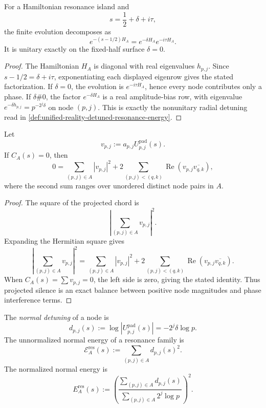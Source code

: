 \begin{theorem}
\label{thm:unified-reality-critical-line-unitary-resonance-surface}
For a Hamiltonian resonance island and
$$
s=\frac12+\delta+i\tau,
$$
the finite evolution decomposes as
$$
e^{-(s-1/2)H_A}
=
e^{-\delta H_A}e^{-i\tau H_A}.
$$
It is unitary exactly on the fixed-half surface $\delta=0$.
\end{theorem}

\begin{proof}
The Hamiltonian $H_A$ is diagonal with real eigenvalues $h_{p,j}$.  Since
$s-1/2=\delta+i\tau$, exponentiating each displayed eigenrow gives the
stated factorization.  If $\delta=0$, the evolution is
$e^{-i\tau H_A}$, hence every node contributes only a phase.  If
$\delta\#0$, the factor $e^{-\delta H_A}$ is a real amplitude-bias row,
with eigenvalue $e^{-\delta h_{p,j}}=p^{-2^j\delta}$ on node $(p,j)$.
This is exactly the nonunitary radial detuning read in
\autoref{def:unified-reality-detuned-resonance-energy}.
\end{proof}

\begin{theorem}
\label{thm:unified-reality-chord-silence-pythagorean-interference}
Let
$$
v_{p,j}:=a_{p,j}U_{p,j}^{\mathrm{pad}}(s).
$$
If $C_A(s)=0$, then
$$
0
=
\sum_{(p,j)\in A}|v_{p,j}|^2
+
2\sum_{(p,j)<(q,k)}
\operatorname{Re}\left(v_{p,j}\overline{v_{q,k}}\right),
$$
where the second sum ranges over unordered distinct node pairs in $A$.
\end{theorem}

\begin{proof}
The square of the projected chord is
$$
\left|\sum_{(p,j)\in A}v_{p,j}\right|^2.
$$
Expanding the Hermitian square gives
$$
\left|\sum_{(p,j)\in A}v_{p,j}\right|^2
=
\sum_{(p,j)\in A}|v_{p,j}|^2
+
2\sum_{(p,j)<(q,k)}
\operatorname{Re}\left(v_{p,j}\overline{v_{q,k}}\right).
$$
When $C_A(s)=\sum v_{p,j}=0$, the left side is zero, giving the stated
identity.  Thus projected silence is an exact balance between positive
node magnitudes and phase interference terms.
\end{proof}

\begin{definition}
\label{def:unified-reality-detuned-resonance-energy}
The \emph{normal detuning} of a node is
$$
d_{p,j}(s)
:=
\log |U_{p,j}^{\mathrm{pad}}(s)|
=
-2^j\delta\log p.
$$
The unnormalized normal energy of a resonance family is
$$
\mathcal E_A^{\mathrm{res}}(s)
:=
\sum_{(p,j)\in A}d_{p,j}(s)^2.
$$
The normalized normal energy is
$$
E_A^{\mathrm{res}}(s)
:=
\left(
\frac{\sum_{(p,j)\in A}d_{p,j}(s)}
{\sum_{(p,j)\in A}2^j\log p}
\right)^2.
$$
\end{definition}

